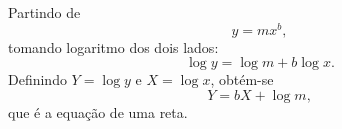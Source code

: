 Partindo de
\[
y=mx^b,
\]
tomando logaritmo dos dois lados:
\[
\log y = \log m + b\log x.
\]
Definindo $Y=\log y$ e $X=\log x$, obtém-se
\[
Y=bX+\log m,
\]
que é a equação de uma reta.

